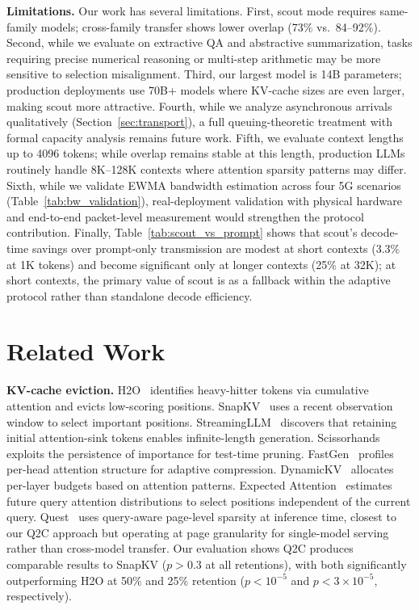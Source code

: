 \documentclass[journal]{IEEEtran}
\newcommand{\QtoC}{\textsc{Q2C}\xspace}
\begin{document}
\textbf{Limitations.}
Our work has several limitations.
First, scout mode requires same-family models; cross-family transfer shows lower overlap (73\% vs.\ 84--92\%).
Second, while we evaluate on extractive QA and abstractive summarization, tasks requiring precise numerical reasoning or multi-step arithmetic may be more sensitive to selection misalignment.
Third, our largest model is 14B parameters; production deployments use 70B+ models where KV-cache sizes are even larger, making scout more attractive.
Fourth, while we analyze asynchronous arrivals qualitatively (Section~\ref{sec:transport}), a full queuing-theoretic treatment with formal capacity analysis remains future work.
Fifth, we evaluate context lengths up to 4096 tokens; while overlap remains stable at this length, production LLMs routinely handle 8K--128K contexts where attention sparsity patterns may differ.
Sixth, while we validate EWMA bandwidth estimation across four 5G scenarios (Table~\ref{tab:bw_validation}), real-deployment validation with physical hardware and end-to-end packet-level measurement would strengthen the protocol contribution.
Finally, Table~\ref{tab:scout_vs_prompt} shows that scout's decode-time savings over prompt-only transmission are modest at short contexts (3.3\% at 1K tokens) and become significant only at longer contexts (25\% at 32K); at short contexts, the primary value of scout is as a fallback within the adaptive protocol rather than standalone decode efficiency.


\section{Related Work}
\label{sec:related}

\textbf{KV-cache eviction.}
H2O~\cite{h2o} identifies heavy-hitter tokens via cumulative attention and evicts low-scoring positions.
SnapKV~\cite{snapkv} uses a recent observation window to select important positions.
StreamingLLM~\cite{streamingllm} discovers that retaining initial attention-sink tokens enables infinite-length generation.
Scissorhands~\cite{scissorhands} exploits the persistence of importance for test-time pruning.
FastGen~\cite{fastgen} profiles per-head attention structure for adaptive compression.
DynamicKV~\cite{dynamickv} allocates per-layer budgets based on attention patterns.
Expected Attention~\cite{sagekv} estimates future query attention distributions to select positions independent of the current query.
Quest~\cite{quest} uses query-aware page-level sparsity at inference time, closest to our \QtoC approach but operating at page granularity for single-model serving rather than cross-model transfer.
Our evaluation shows \QtoC produces comparable results to SnapKV ($p > 0.3$ at all retentions), with both significantly outperforming H2O at 50\% and 25\% retention ($p < 10^{-5}$ and $p < 3 \times 10^{-5}$, respectively).
\end{document}
